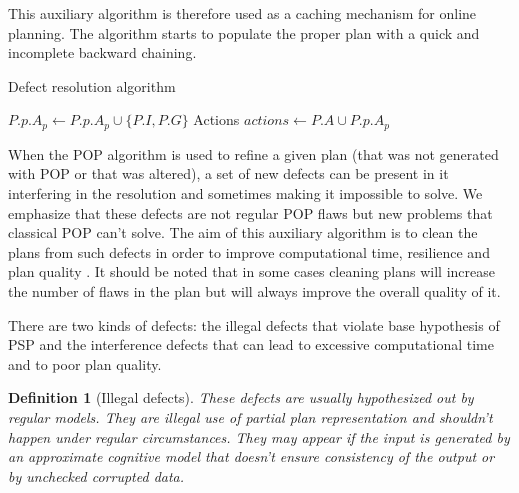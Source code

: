 \documentclass[]{article}
\newtheorem{definition}{Definition}
\begin{document}
This auxiliary algorithm is therefore used as a caching mechanism for
online planning. The algorithm starts to populate the proper plan with a
quick and incomplete backward chaining.


\begin{algorithm}\caption{Defect resolution algorithm}\label{defectresolution}\begin{algorithmic}

 \State {}
\State {} \EndFunction

\State {}
\State {}
\State \(P.p.A_p \gets P.p.A_p \cup \{P.I, P.G\}\)
\State {} \State Actions
\(actions \gets P.A \cup P.p.A_p\) 
\State {} \State {}
\EndFor
    \State {} \EndFunction

 \State {}
\State {} \EndFunction

\end{algorithmic}\end{algorithm}

When the POP algorithm is used to refine a given plan (that was not
generated with POP or that was altered), a set of new defects can be
present in it interfering in the resolution and sometimes making it
impossible to solve. We emphasize that these defects are not regular POP
flaws but new problems that classical POP can't solve. The aim of this
auxiliary algorithm is to clean the plans from such defects in order to
improve computational time, resilience and plan quality . It should be
noted that in some cases cleaning plans will increase the number of
flaws in the plan but will always improve the overall quality of it.

There are two kinds of defects: the illegal defects that violate base
hypothesis of PSP and the interference defects that can lead to
excessive computational time and to poor plan quality.

\begin{definition}[Illegal defects]

These defects are usually hypothesized out by regular models. They are
illegal use of partial plan representation and shouldn't happen under
regular circumstances. They may appear if the input is generated by an
approximate cognitive model that doesn't ensure consistency of the
output or by unchecked corrupted data.

\end{definition}
\end{document}
